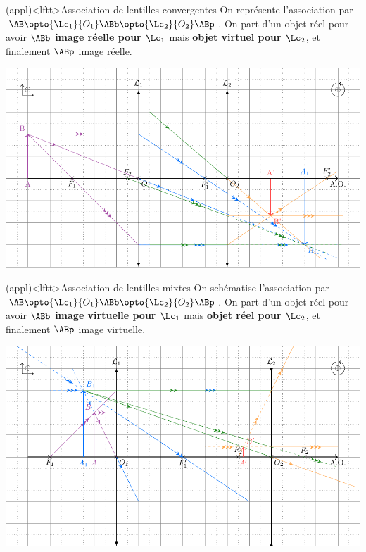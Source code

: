 \documentclass[../../main/main.tex]{subfiles}
\begin{document}
\begin{tcn}[label=exem:asso_lent](appl)<lftt>{Association de lentilles convergentes}
	On représente l'association par $\AB \opto{\Lc_1}{O_1} \ABb
		\opto{\Lc_2}{O_2} \ABp$. On part d'un objet réel pour avoir $\ABb$
	\textbf{image réelle pour $\Lc_1$} mais \textbf{objet virtuel pour $\Lc_2$},
	et finalement $\ABp$ image réelle.
	\tcblower
	\begin{center}
		\includegraphics[width=.85\linewidth]{asso_lent-a.pdf}
		\label{fig:asso_lent-conv}
	\end{center}
\end{tcn}
\begin{tcn}[label=exem:asso_lent](appl)<lftt>{Association de lentilles mixtes}
	On schématise l'association par $\AB \opto{\Lc_1}{O_1} \ABb
		\opto{\Lc_2}{O_2} \ABp$. On part d'un objet réel pour avoir $\ABb$
	\textbf{image virtuelle pour $\Lc_1$} mais \textbf{objet réel pour $\Lc_2$},
	et finalement $\ABp$ image virtuelle.
	\tcblower
	\begin{center}
		\includegraphics[width=.85\linewidth]{asso_lent-b.pdf}
		\label{fig:asso_lent-mix}
	\end{center}
\end{tcn}
\end{document}
